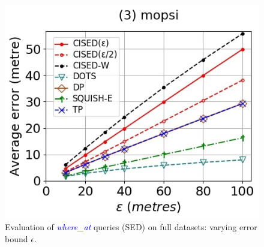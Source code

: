 {\begin{figure}[tb!]
	\includegraphics[scale = 0.250]{Figures/Exp-where-SED-error-epsilon-mopsi.jpg}
	\vspace{-1ex}
	\caption{\small Evaluation of \textcolor{blue}{\emph{where\_at}} queries (SED) on full datasets: varying error bound $\epsilon$.}
	\label{fig:query-sed-epsilon}
	\vspace{-1.0ex}
\end{figure}

}
